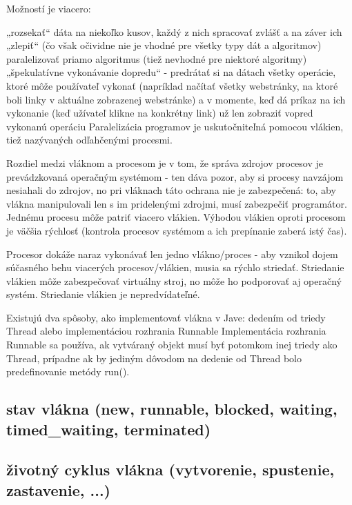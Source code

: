 Možností je viacero:

„rozsekať“ dáta na niekoľko kusov, každý z nich spracovať zvlášť a na záver ich „zlepiť“ (čo však očividne nie je vhodné pre všetky typy dát a algoritmov)
paralelizovať priamo algoritmus (tiež nevhodné pre niektoré algoritmy)
„špekulatívne vykonávanie dopredu“ - predrátať si na dátach všetky operácie, ktoré môže používateľ vykonať (napríklad načítať všetky webstránky, na ktoré boli linky v aktuálne zobrazenej webstránke) a v momente, keď dá príkaz na ich vykonanie (keď užívateľ klikne na konkrétny link) už len zobraziť vopred vykonanú operáciu
Paralelizácia programov je uskutočniteľná pomocou vlákien, tiež nazývaných odľahčenými procesmi.

Rozdiel medzi vláknom a procesom je v tom, že správa zdrojov procesov je prevádzkovaná operačným systémom - ten dáva pozor, aby si procesy navzájom nesiahali do zdrojov, no pri vláknach táto ochrana nie je zabezpečená: to, aby vlákna manipulovali len s im pridelenými zdrojmi, musí zabezpečiť programátor. Jednému procesu môže patriť viacero vlákien. Výhodou vlákien oproti procesom je väčšia rýchlosť (kontrola procesov systémom a ich prepínanie zaberá istý čas).

Procesor dokáže naraz vykonávať len jedno vlákno/proces - aby vznikol dojem súčasného behu viacerých procesov/vlákien, musia sa rýchlo striedať. Striedanie vlákien môže zabezpečovať virtuálny stroj, no môže ho podporovať aj operačný systém. Striedanie vlákien je nepredvídateľné.


Existujú dva spôsoby, ako implementovať vlákna v Jave: dedením od triedy Thread alebo implementáciou rozhrania Runnable
Implementácia rozhrania Runnable sa používa, ak vytváraný objekt musí byť potomkom inej triedy ako Thread, prípadne ak by jediným dôvodom na dedenie od Thread bolo predefinovanie metódy run().



	\subsection{stav vlákna (new, runnable, blocked, waiting, timed\_waiting, terminated)}







	\subsection{životný cyklus vlákna (vytvorenie, spustenie, zastavenie, ...)}

